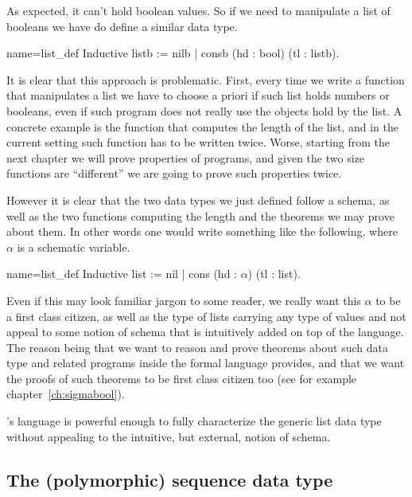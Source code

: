 As expected, it can't hold boolean values.  So if we need to
manipulate a list of booleans we have do define a similar data type.

\begin{coq}{name=list_def}{}
Inductive listb := nilb | consb (hd : bool) (tl : listb).
\end{coq}

It is clear that this approach is problematic.  First, every time we
write a function that manipulates a list we have to choose a priori
if such list holds numbers or booleans, even if such program does not
really use the objects hold by the list.
A concrete example is the function that computes the length of the list,
and in the current setting such function has to be written twice.
Worse, starting from the next chapter we will prove properties of programs,
and given the two size functions are ``different'' we are going to prove such
properties twice.

However it is clear that the two data types we just defined follow
a schema, as well as the two functions computing the length and the
theorems we may prove about them.  In other words one would write something
like the following, where $\alpha$ is a schematic variable.

\begin{coq}{name=list_def}{}
Inductive list := nil | cons (hd : $\alpha$) (tl : list).
\end{coq}

\noindent Even if this may look familiar jargon to some reader, we really want
this $\alpha$ to be a first class citizen, as well as the type of lists carrying
any type of values and not appeal to some notion of schema that is intuitively
added on top of the \Coq{} language.  The reason being that we want to 
reason and
prove theorems about such data type and related programs inside the formal
language \Coq{} provides, and that we want the proofs of such 
theorems to be first
class citizen too (see for example chapter~\ref{ch:sigmabool}).

\Coq{}'s language is powerful enough to fully characterize the generic 
list data type without appealing to the intuitive, but external, notion of
schema.

\subsection{The (polymorphic) sequence data type}

